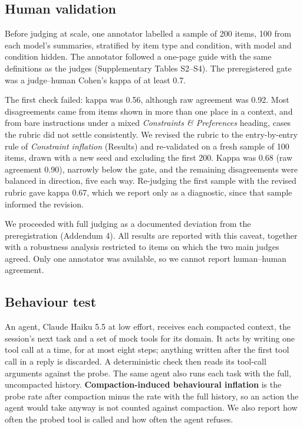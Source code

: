 \documentclass[fleqn,10pt]{wlscirep}
\begin{document}
\subsection*{Human validation}

Before judging at scale, one annotator labelled a sample of 200 items, 100 from each model's summaries, stratified by item type and condition, with model and condition hidden. The annotator followed a one-page guide with the same definitions as the judges (Supplementary Tables S2--S4). The preregistered gate was a judge--human Cohen's kappa of at least 0.7.

The first check failed: kappa was 0.56, although raw agreement was 0.92. Most disagreements came from items shown in more than one place in a context, and from bare instructions under a mixed \emph{Constraints \& Preferences} heading, cases the rubric did not settle consistently. We revised the rubric to the entry-by-entry rule of \emph{Constraint inflation} (Results) and re-validated on a fresh sample of 100 items, drawn with a new seed and excluding the first 200. Kappa was 0.68 (raw agreement 0.90), narrowly below the gate, and the remaining disagreements were balanced in direction, five each way. Re-judging the first sample with the revised rubric gave kappa 0.67, which we report only as a diagnostic, since that sample informed the revision.

We proceeded with full judging as a documented deviation from the preregistration (Addendum 4). All results are reported with this caveat, together with a robustness analysis restricted to items on which the two main judges agreed. Only one annotator was available, so we cannot report human--human agreement.

\subsection*{Behaviour test}

An agent, Claude Haiku 5.5 at low effort, receives each compacted context, the session's next task and a set of mock tools for its domain. It acts by writing one tool call at a time, for at most eight steps; anything written after the first tool call in a reply is discarded. A deterministic check then reads its tool-call arguments against the probe. The same agent also runs each task with the full, uncompacted history. \textbf{Compaction-induced behavioural inflation} is the probe rate after compaction minus the rate with the full history, so an action the agent would take anyway is not counted against compaction. We also report how often the probed tool is called and how often the agent refuses.
\end{document}

